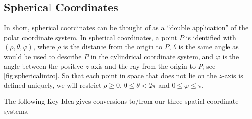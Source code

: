 \subsection{Spherical Coordinates}


In short, spherical coordinates can be thought of as a ``double application'' of the polar coordinate system. In spherical coordinates, a point $P$ is identified with $(\rho,\theta,\varphi)$, where $\rho$ is the distance from the origin to $P$, $\theta$ is the same angle as would be used to describe $P$ in the cylindrical coordinate system, and $\varphi$ is the angle between the positive $z$-axis and the ray from the origin to $P$; see \autoref{fig:sphericalintro}. So that each point in space that does not lie on the $z$-axis is defined uniquely, we will restrict $\rho \geq 0$, $0 \leq \theta < 2\pi$ and $0 \leq \varphi \leq \pi$.

The following Key Idea gives conversions to/from our three spatial coordinate systems.


